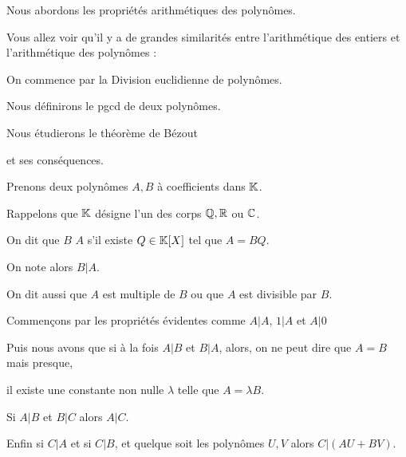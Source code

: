 






\debuttexte

\diapo

Nous abordons les propriétés arithmétiques des polynômes.

\change

Vous allez voir qu'il y a de grandes similarités entre l'arithmétique des entiers
et l'arithmétique des polynômes :

\change

On commence par la Division euclidienne de polynômes.

\change

Nous définirons le pgcd de deux polynômes.

\change

Nous étudierons le théorème de Bézout 

et ses conséquences.



\diapo

Prenons deux polynômes $A,B$ à coefficients dans $\mathbb{K}$.

Rappelons que $\mathbb{K}$ désigne l'un des corps $\mathbb{Q}, \mathbb{R}$ ou $\mathbb{C}$.

On dit que $B$  $A$ s'il existe  $Q\in\mathbb{K}[X]$ tel que $A=BQ$.

\change

On note alors $B|A$.

On dit aussi que $A$ est multiple de $B$ ou que $A$ est divisible par $B$.

\change

Commençons par les propriétés évidentes comme $A|A$, $1|A$ et $A|0$

\change

Puis nous avons que si à la fois
 $A|B$ et $B|A$, alors, on ne peut dire que $A=B$ mais presque,
 
il existe une constante non nulle $\lambda$ telle que   $A=\lambda B$.
 
\change

Si $A|B$ et $B|C$ alors $A|C$.

\change

Enfin si $C|A$ et si $C|B$, et quelque soit les polynômes $U,V$ alors  $C|(AU+BV)$.

